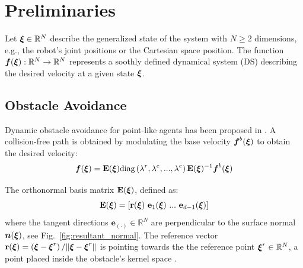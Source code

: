 \section{Preliminaries}
Let $\boldsymbol{\xi} \in \mathbb{R}^N$ describe the generalized state of the system with $N \geq 2$ dimensions, e.g., the robot's joint positions or the Cartesian space position.
The function $\boldsymbol{f}(\boldsymbol{\xi}): \mathbb{R}^N \rightarrow \mathbb{R}^N$ represents a soothly defined dynamical system (DS) describing the desired velocity at a given state $\boldsymbol{\xi}$.  

\subsection{Obstacle Avoidance}
Dynamic obstacle avoidance for point-like agents has been proposed in \cite{huber2022avoiding}. A collision-free path is obtained by modulating the base velocity $\boldsymbol{f}^b(\boldsymbol{\xi})$ to obtain the desired velocity:
\begin{equation}
  \vecs f(\vecs \xi) = \textbf{E}(\vecs \xi) \text{diag} \left(\lambda^r, \lambda^e, ..., \lambda^e \right) \textbf{E}(\vecs{\xi})^{-1} \vect f^b(\vecs \xi)
  \label{eq:modulated} 
\end{equation}

The orthonormal basis matrix $\textbf{E}(\boldsymbol{\xi})$, defined as:
\begin{equation}
\textbf{E}(\vecs \xi) = \left[ \textbf{r}(\vecs \xi) \ \textbf{e}_1(\vecs \xi) \ ... \ \textbf{e}_{d-1}(\vecs \xi) \right]
\label{eq:matrix_E}
\end{equation}
where the tangent directions $\textbf{e}_{(\cdot)} \in \mathbb{R}^N$ are perpendicular to the surface normal $\boldsymbol{n}(\boldsymbol{\xi})$, see Fig.~\ref{fig:resultant_normal}. The reference vector $\textbf{r}(\boldsymbol{\xi}) =  \left( \boldsymbol{\xi}-\boldsymbol{\xi}^r \right) / \| \boldsymbol{\xi}-\boldsymbol{\xi} ^r \|$ is pointing towards the the reference point $\boldsymbol{\xi}^r \in \mathbb{R}^N$, a point placed inside the obstacle's kernel space \cite{huber2023avoidance}.

